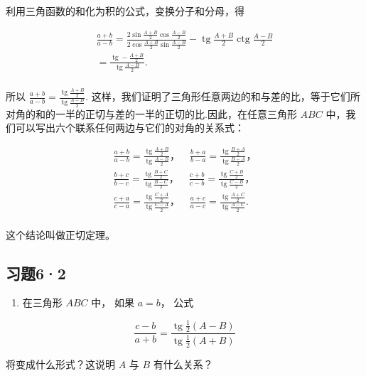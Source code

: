 利用三角函数的和化为积的公式，变换分子和分母，得

\[
\begin{array}{l} \frac {a + b}{a - b} = \frac {2 \sin \frac {A + B}{2} \cos \frac {A - B}{2}}{2 \cos \frac {A + B}{2} \sin \frac {A - B}{2}} - \operatorname{tg} \frac {A + B}{2} \operatorname{ctg} \frac {A - B}{2} \\ = \frac {\operatorname{tg} - \frac {A + B}{2}}{\operatorname{tg} \frac {A - B}{2}}. \\ \end{array}
\]

所以
\(\frac{a + b}{a - b} = \frac{\operatorname{tg}\frac{A + B}{2}}{\operatorname{tg}\frac{A - B}{2}}.\)
这样，我们证明了三角形任意两边的和与差的比，等于它们所对角的和的一半的正切与差的一半的正切的比.因此，在任意三角形
\(ABC\) 中，我们可以写出六个联系任何两边与它们的对角的关系式：

\[
\begin{array}{l} \frac {a + b}{a - b} = \frac {\operatorname{tg} \frac {A + B}{2}}{\operatorname{tg} \frac {A - B}{2}}\text{，} \quad \frac {b + a}{b - a} = \frac {\operatorname{tg} \frac {B + A}{2}}{\operatorname{tg} \frac {B - A}{2}}\text{，} \\ \frac {b + c}{b - c} = \frac {\operatorname{tg} \frac {B + C}{2}}{\operatorname{tg} \frac {B - C}{2}}\text{，} \quad \frac {c + b}{c - b} = \frac {\operatorname{tg} \frac {C + B}{2}}{\operatorname{tg} \frac {C - B}{2}}\text{，} \\ \frac {c + a}{c - a} = \frac {\operatorname{tg} \frac {C + A}{2}}{\operatorname{tg} \frac {C - A}{2}}\text{，} \quad \frac {a + c}{a - c} = \frac {\operatorname{tg} \frac {A + C}{2}}{\operatorname{tg} \frac {A - C}{2}}. \\ \end{array}
\]

这个结论叫做正切定理。

\subsection{习题6·2}

\begin{enumerate}
\item
  在三角形 \(ABC\) 中， 如果 \(a = b\)， 公式
\end{enumerate}

\[
\frac {c - b}{a + b} = \frac {\operatorname{tg} \frac {1}{2} (A - B)}{\operatorname{tg} \frac {1}{2} (A + B)}
\]

将变成什么形式？这说明 \(A\) 与 \(B\) 有什么关系？

